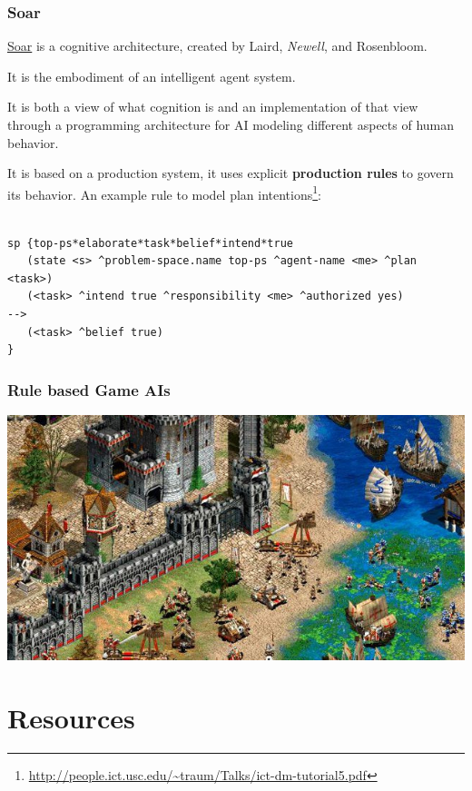 \documentclass[xcolor={usenames,dvipsnames,svgnames}, compress]{beamer}
\begin{document}
\begin{frame}
  \frametitle{Soar}
  \href{http://soar.eecs.umich.edu/}{Soar} is a cognitive architecture, created by Laird, \emph{Newell},
  and Rosenbloom.\par\bigskip
  
  It is the embodiment of an intelligent agent system.\par\bigskip
  It is both a view of what cognition is and an implementation of that
  view through a programming architecture for AI modeling different aspects of human
  behavior.\par\bigskip
  It is based on a production system, it uses explicit \textbf{production
    rules} to govern its behavior. An example rule to model plan intentions\footnote{\url{http://people.ict.usc.edu/~traum/Talks/ict-dm-tutorial5.pdf}}:
  {\tiny
\begin{verbatim}

sp {top-ps*elaborate*task*belief*intend*true
   (state <s> ^problem-space.name top-ps ^agent-name <me> ^plan <task>)
   (<task> ^intend true ^responsibility <me> ^authorized yes)
-->
   (<task> ^belief true)
}
\end{verbatim}}
\end{frame}


\begin{frame}
  \frametitle{Rule based Game AIs}
  \begin{center}
    \includegraphics[width=1.0\textwidth]{Figures/aokii-crop}
  \end{center}
\end{frame}

\section{Resources}
{
  \begin{frame}
    \sectionpage
  \end{frame}
}
\end{document}
